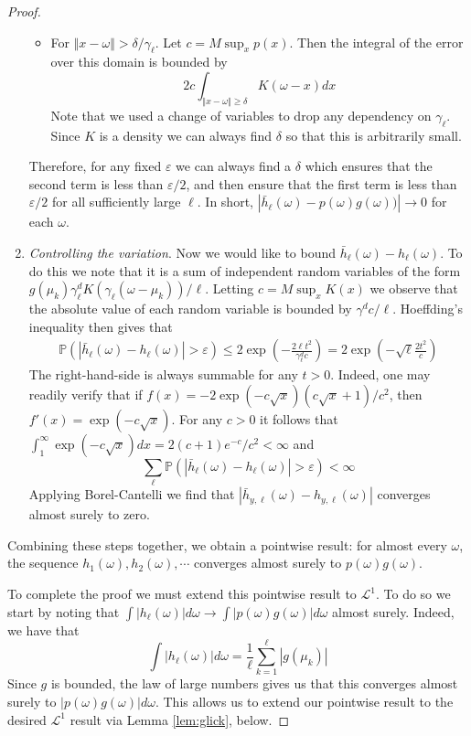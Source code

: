 \documentclass{article}
\theoremstyle{definition}
\begin{document}
\begin{proof}
\begin{enumerate}
\begin{itemize}
    \item For $\Vert x-\omega\Vert > \delta/\gamma_\ell$.  Let $c=M\sup_x p(x)$.  Then the integral of the error over this domain is bounded by
    \[
    2c\int_{\Vert x-\omega \Vert \geq \delta} K(\omega - x) dx
    \]
    Note that we used a change of variables to drop any dependency on $\gamma_\ell$. Since $K$ is a density we can always find $\delta$ so that this is arbitrarily small.
\end{itemize}

Therefore, for any fixed $\varepsilon$ we can always find a $\delta$ which ensures that the second term is less than $\varepsilon/2$, and then ensure that the first term is less than $\varepsilon/2$ for all sufficiently large $\ell$.  In short, $|\bar h_{\ell}(\omega) - p(\omega)g(\omega))| \rightarrow 0$ for each $\omega$.

\item \emph{Controlling the variation}.  Now we would like to bound $\bar h_{\ell}(\omega) -  h_{\ell}(\omega)$.  To do this we note that it is a sum of independent random variables of the form $g(\mu_k)\gamma_\ell^d K(\gamma_\ell (\omega-\mu_k))/\ell$.  Letting $c=M \sup_x K(x)$ we observe that the absolute value of each random variable is bounded by $\gamma^d c/\ell$.  Hoeffding's inequality then gives that 
\begin{gather*}
\mathbb{P}\left(\left|\bar h_{\ell}(\omega) -  h_{\ell}(\omega)\right| > \varepsilon\right) 
\leq 2\exp\left(-\frac{2\ell t^2}{\gamma^d_\ell c}\right)
= 2\exp\left(-\sqrt{\ell} \frac{2 t^2}{c}\right)
\end{gather*}
The right-hand-side is always summable for any $t>0$.  Indeed, one may readily verify that if $f(x)=-2\exp(-c\sqrt{x})(c\sqrt{x}+1)/c^2$, then $f'(x)=\exp(-c\sqrt{x})$.  For any $c>0$ it follows that $\int_1^\infty \exp\left(-c\sqrt{x}\right) dx=2(c+1)e^{-c}/c^2 < \infty$ and 
\[
\sum_\ell \mathbb{P}\left(\left|\bar h_{\ell}(\omega) -  h_{\ell}(\omega)\right| > \varepsilon\right) < \infty 
\]
Applying Borel-Cantelli we find that $|\bar h_{y,\ell}(\omega)-h_{y,\ell}(\omega)|$ converges almost surely to zero.  
\end{enumerate}
Combining these steps together, we obtain a pointwise result: for almost every $\omega$, the sequence  $h_1(\omega),h_{2}(\omega),\cdots$ converges almost surely to $p(\omega)g(\omega)$.  

To complete the proof we must extend this pointwise result to $\mathscr{L}^1$.  To do so we start by noting that $\int |h_\ell(\omega)|d\omega \rightarrow \int |p(\omega)g(\omega)|d\omega$ almost surely.  Indeed, we have that 
\[
\int |h_\ell(\omega)|d\omega = \frac{1}{\ell} \sum_{k=1}^{\ell}|g(\mu_k)|
\]
Since $g$ is bounded, the law of large numbers gives us that this converges almost surely to $|p(\omega)g(\omega)|d\omega$.  This allows us to extend our pointwise result to the desired $\mathscr{L}^1$ result via Lemma \ref{lem:glick}, below.
\end{proof}
\end{document}
